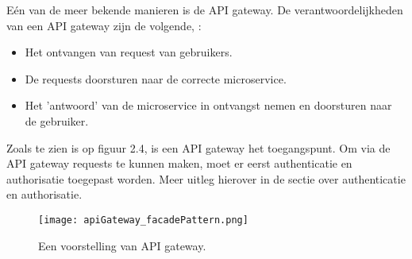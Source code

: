 Eén van de meer bekende manieren is de API gateway. De verantwoordelijkheden van een API gateway zijn de volgende, \textcite{Siraj2017}:
\begin{itemize}
	\item Het ontvangen van request van gebruikers.
	\item De requests doorsturen naar de correcte microservice.
	\item Het 'antwoord' van de microservice in ontvangst nemen en doorsturen naar de gebruiker.
\end{itemize}
Zoals te zien is op figuur 2.4, is een API gateway het toegangspunt. Om via de API gateway requests te kunnen maken, moet er eerst authenticatie en authorisatie toegepast worden. Meer uitleg hierover in de sectie over authenticatie en authorisatie.
\begin{figure}[h!]
	\texttt{[image: apiGateway\_facadePattern.png]}
	\centering
	\caption{Een voorstelling van API gateway. \textcite{Siraj2017}}
\end{figure}


